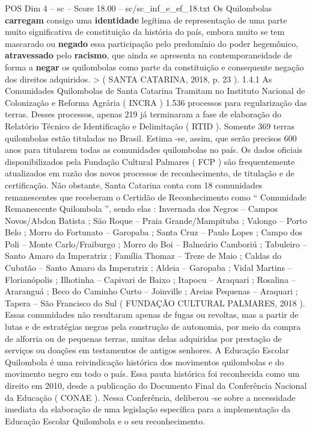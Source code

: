 \begin{textsample}{POS Dim 4 – sc – Score 18.00 – sc/sc\_inf\_e\_ef\_18.txt}
Os Quilombolas \textbf{carregam} consigo uma \textbf{identidade} legítima de representação de uma parte muito significativa de constituição da história do país, embora muito se tem mascarado ou \textbf{negado} essa participação pelo predomínio do poder hegemônico, \textbf{atravessado} pelo \textbf{racismo}, que ainda se apresenta na contemporaneidade de forma a \textbf{negar} os quilombolas como parte da constituição e consequente negação dos direitos adquiridos. > ( SANTA CATARINA, 2018, p. 23 ). 1.4.1 As Comunidades Quilombolas de Santa Catarina Tramitam no Instituto Nacional de Colonização e Reforma Agrária ( INCRA ) 1.536 processos para regularização das terras.
Desses processos, apenas 219 já terminaram a fase de elaboração do Relatório Técnico de Identificação e Delimitação ( RTID ).
Somente 369 terras quilombolas estão tituladas no Brasil.
Estima -se, assim, que serão precisos 600 anos para titularem todas as comunidades quilombolas no país.
Os dados oficiais disponibilizados pela Fundação Cultural Palmares ( FCP ) são frequentemente atualizados em razão dos novos processos de reconhecimento, de titulação e de certificação.
Não obstante, Santa Catarina conta com 18 comunidades remanescentes que receberam o Certidão de Reconhecimento como “ Comunidade Remanescente Quilombola ”, sendo elas : Invernada dos Negros – Campos Novos/Abdon Batista ; São Roque – Praia Grande/Mampituba ; Valongo – Porto Belo ; Morro do Fortunato – Garopaba ; Santa Cruz – Paulo Lopes ; Campo dos Poli – Monte Carlo/Fraiburgo ; Morro do Boi – Balneário Camboriú ; Tabuleiro – Santo Amaro da Imperatriz ; Família Thomaz – Treze de Maio ; Caldas do Cubatão – Santo Amaro da Imperatriz ; Aldeia – Garopaba ; Vidal Martins – Florianópolis ; Ilhotinha – Capivari de Baixo ; Itapocu – Araquari ; Rosalina – Araranguá ; Beco do Caminho Curto – Joinville ; Areias Pequenas – Araquari ; Tapera – São Francisco do Sul ( FUNDAÇÃO CULTURAL PALMARES, 2018 ).
Essas comunidades não resultaram apenas de fugas ou revoltas, mas a partir de lutas e de estratégias negras pela construção de autonomia, por meio da compra de alforria ou de pequenas terras, muitas delas adquiridas por prestação de serviços ou doações em testamentos de antigos senhores.
A Educação Escolar Quilombola é uma reivindicação histórica dos movimentos quilombolas e do movimento negro em todo o país.
Essa pauta histórica foi reconhecida como um direito em 2010, desde a publicação do Documento Final da Conferência Nacional da Educação ( CONAE ).
Nessa Conferência, deliberou -se sobre a necessidade imediata da elaboração de uma legislação específica para a implementação da Educação Escolar Quilombola e o seu reconhecimento.

\end{textsample}
